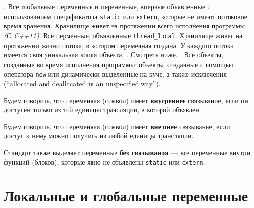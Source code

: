 \begin{itemize}
  . Все глобальные переменные и переменные, впервые объявленные с использованием
  спецификатора \verb|static| или \verb|extern|, которые не имеют потоковое время хранения.
  Хранилище живет на протяжении всего исполнения программы.
   {\small\textit{(С C++11)}}. Все перменные, объявленные \verb|thread_local|.
  Хранилище живет на протяжении жизни потока, в котором переменная создана. У каждого потока имеется
  своя уникальная копия объекта.
  . Смотреть \hyperref[def:auto_storage]{ниже}.
  . Все объекты, созданные во время исполнения программы:
  объекты, созданные с помощью оператора \verb|new| или динамически выделенные на куче,
  а также исключения (``allocated and deallocated in an unspecified way'').
\end{itemize}

Будем говорить, что переменная (символ) имеет \textbf{внутреннее} связывание, если он доступен
только из той единицы трансляции, в которой объявлен.

Будем говорить, что переменная (символ) имеет \textbf{внешнее} связывание, если доступ к нему
можно получить из любой единицы трансляции.

Стандарт также выделяет переменные \textbf{без связывания} --- все переменные внутри функций (блоков),
которые явно не объявлены \verb|static| или \verb|extern|.

\section{Локальные и глобальные переменные}
